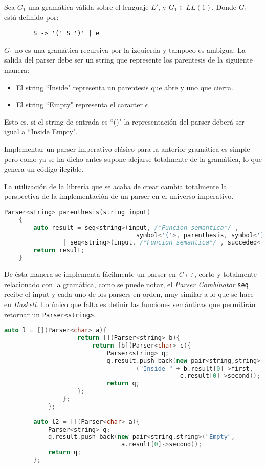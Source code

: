 	\begin{exmp}
		Sea $G_1$ una gramática válida sobre el lenguaje $L'$, y $G_1 \in LL(1)$.
		Donde $G_1$ está definido por:
		
		\begin{lstlisting}
		S -> '(' S ')' | e
		\end{lstlisting}
		
		$G_1$ no es una gramática recursiva por la izquierda y tampoco es ambigua.
		La salida del parser debe ser un string que represente los parentesis de la siguiente manera:
		\begin{itemize}
			\item El string ``Inside" representa un parentesis que abre y uno que cierra.
			\item El string ``Empty" representa el caracter $\epsilon$.
		\end{itemize}
		Esto es, si el string de entrada es ``()" la representación del parser deberá ser igual a ``Inside Empty".		
	\end{exmp}
	
	Implementar un parser imperativo clásico para la anterior gramática es simple pero como ya se ha dicho antes supone alejarse totalmente de la gramática, lo que genera un código ilegible.

	La utilización de la librería que se acaba de crear cambia totalmente la perspectiva de la implementación de un parser en el universo imperativo.
	
	\begin{lstlisting}[language=C++, caption=utilización de los Parser combinators en C++]
	Parser<string> parenthesis(string input)
	{
		auto result = seq<string>(input, /*Funcion semantica*/ , 
									symbol<'('>, parenthesis, symbol<')'>) 
				| seq<string>(input, /*Funcion semantica*/ , succeded<'e'>);
		return result;
	}		
	\end{lstlisting}
	
	De ésta manera se implementa fácilmente un parser en \emph{C++}, corto y totalmente relacionado con la gramática, como se puede notar, el \emph{Parser Combinator} \texttt{seq} recibe el input y cada uno de los parsers en orden, muy similar a lo que se hace en \emph{Haskell}. Lo único que falta es definir las funciones semánticas que permitirán retornar un \texttt{Parser<string>}. 
	
	\begin{lstlisting}[language=C++, caption=Funciones semánticas en C++]
		auto l = [](Parser<char> a){
					return [](Parser<string> b){
						return [b](Parser<char> c){
							Parser<string> q;
							q.result.push_back(new pair<string,string>
									("Inside " + b.result[0]->first, 
												c.result[0]->second));
							return q;
					};
				};
			};
		
		auto l2 = [](Parser<char> a){
			Parser<string> q;
			q.result.push_back(new pair<string,string>("Empty", 
								a.result[0]->second));
			return q;
		};		
	\end{lstlisting}
	
